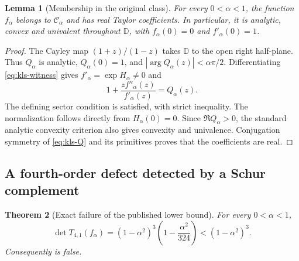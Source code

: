 \documentclass[11pt,a4paper]{article}
\numberwithin{equation}{section}
\newtheorem{theorem}{Theorem}[section]
\newtheorem{lemma}[theorem]{Lemma}
\theoremstyle{definition}\newtheorem{definition}[theorem]{Definition}
\theoremstyle{remark}\newtheorem{remark}[theorem]{Remark}
\begin{document}
\begin{lemma}[Membership in the original class]
\label{lem:kls-membership}
For every $0<\alpha<1$, the function $f_\alpha$ belongs to
$\mathcal C_\alpha$ and has real Taylor coefficients.  In particular,
it is analytic, convex and univalent throughout $\mathbb D$, with
$f_\alpha(0)=0$ and $f'_\alpha(0)=1$.
\end{lemma}

\begin{proof}
The Cayley map $(1+z)/(1-z)$ takes $\mathbb D$ to the open right
half-plane.  Thus $Q_\alpha$ is analytic, $Q_\alpha(0)=1$, and
$|\arg Q_\alpha(z)|<\alpha\pi/2$.  Differentiating
\eqref{eq:kls-witness} gives $f'_\alpha=\exp H_\alpha\ne0$ and
\[
 1+\frac{zf''_\alpha(z)}{f'_\alpha(z)}=Q_\alpha(z).
\]
The defining sector condition is satisfied, with strict inequality.
The normalization follows directly from $H_\alpha(0)=0$.
Since $\Re Q_\alpha>0$, the standard analytic convexity criterion
also gives convexity and univalence.  Conjugation symmetry of
\eqref{eq:kls-Q} and its primitives proves that the coefficients are real.
\end{proof}

\subsection{A fourth-order defect detected by a Schur complement}

\begin{theorem}[Exact failure of the published lower bound]
\label{thm:kls-four}
For every $0<\alpha<1$,
\begin{equation}
 \det T_{4,1}(f_\alpha)
  =(1-\alpha^2)^3\left(1-\frac{\alpha^2}{324}\right)
  <(1-\alpha^2)^3.
 \label{eq:kls-det4}
\end{equation}
Consequently \cite[Conjecture~1]{KLS2021} is false.
\end{theorem}
\end{document}
